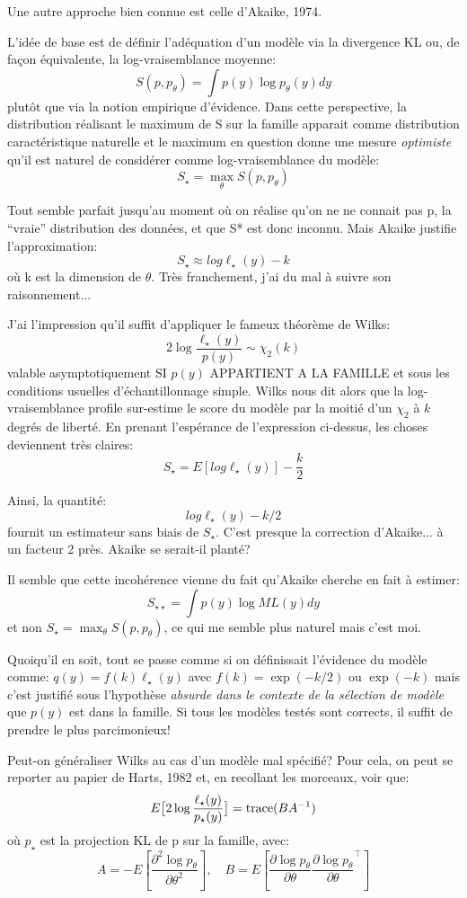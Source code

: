 \documentclass{article}
\begin{document}
Une autre approche bien connue est celle d'Akaike, 1974.

L'id\'ee de base est de d\'efinir l'ad\'equation d'un mod\`ele via la divergence KL ou, de fa\c{c}on \'equivalente, la log-vraisemblance moyenne: 
$$S(p, p_\theta) = \int p(y) \log p_\theta(y) dy$$ 
plut\^ot que via la notion empirique d'\'evidence. Dans cette perspective, la distribution r\'ealisant le maximum de S sur la famille apparait comme distribution caract\'eristique naturelle et le maximum en question donne une mesure {\em optimiste} qu'il est naturel de consid\'erer comme log-vraisemblance du mod\`ele: 
$$S_\star = \max_\theta S(p, p_\theta)$$ 

Tout semble parfait jusqu'au moment o\`u on r\'ealise qu'on ne ne connait pas p, la ``vraie'' distribution des donn\'ees, et que S* est donc inconnu. Mais Akaike justifie l'approximation: 
$$S_\star \approx log \ell_\star(y) - k$$ 
o\`u k est la dimension de $\theta$. Tr\`es franchement, j'ai du mal \`a suivre son raisonnement... 

J'ai l'impression qu'il suffit d'appliquer le fameux th\'eor\`eme de Wilks: 
$$2 \log \frac{\ell_\star(y)}{p(y)} \sim \chi_2(k)$$ 
valable asymptotiquement SI $p(y)$ APPARTIENT A LA FAMILLE et sous les conditions usuelles d'\'echantillonnage simple. Wilks nous dit alors que la log-vraisemblance profile sur-estime le score du mod\`ele par la moiti\'e d'un $\chi_2$ \`a $k$ degr\'es de libert\'e. En prenant l'esp\'erance de l'expression ci-dessus, les choses deviennent tr\`es claires: 
$$S_\star = E[log \ell_\star(y)] - \frac{k}{2}$$ 

Ainsi, la quantit\'e: 
$$log \ell_\star(y) - k/2$$ 
fournit un estimateur sans biais de $S_\star$. C'est presque la correction d'Akaike... \`a un facteur 2 pr\`es. Akaike se serait-il plant\'e? 

Il semble que cette incoh\'erence vienne du fait qu'Akaike cherche en fait \`a estimer: 
$$S_{\star\star} = \int p(y) \log ML(y) dy$$ 
et non $S_\star = \max_\theta S(p, p_\theta)$, ce qui me semble plus naturel mais c'est moi. 

Quoiqu'il en soit, tout se passe comme si on d\'efinissait l'\'evidence du mod\`ele comme: $q(y) = f(k) \ell_\star(y)$ avec $f(k) = \exp(-k/2)$ ou $\exp(-k)$ mais c'est justifi\'e sous l'hypoth\`ese {\em absurde dans le contexte de la s\'election de mod\`ele} que $p(y)$ est dans la famille. Si tous les mod\`eles test\'es sont corrects, il suffit de prendre le plus parcimonieux! 

Peut-on g\'en\'eraliser Wilks au cas d'un mod\`ele mal sp\'ecifi\'e? Pour cela, on peut se reporter au papier de Harts, 1982 et, en recollant les morceaux, voir que: 
$$
E \big[2 \log \frac{\ell_\star(y)}{p_\star(y)} \big] = {\rm trace}(B A^{-1})
$$ 
o\`u $p_\star$ est la projection KL de p sur la famille, avec:
$$
A = -E\left[ \frac{\partial^2 \log p_\theta}{\partial\theta^2} \right],
\quad 
B = E\left[ \frac{\partial \log p_\theta}{\partial\theta} \frac{\partial \log p_\theta}{\partial\theta}^\top \right]
$$ 
\end{document}
